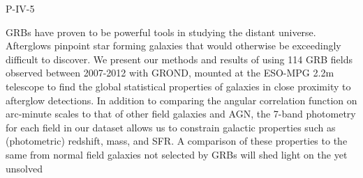 P-IV-5


\bigskip



\bigskip

\noindent GRBs have proven to be powerful tools in studying the distant universe. Afterglows pinpoint star forming galaxies that would otherwise be  exceedingly difficult to discover. We present our methods and results of using 114 GRB fields observed between 2007-2012 with GROND, mounted at the ESO-MPG 2.2m telescope to find the global statistical properties of galaxies in close proximity to afterglow detections. In addition to comparing the angular correlation function on arc-minute scales to that of other field galaxies and AGN, the 7-band photometry for each field in our dataset allows us to constrain galactic properties such as (photometric) redshift, mass, and SFR. A comparison of these properties to the same from  normal field galaxies not selected by GRBs will shed light on the yet unsolved
